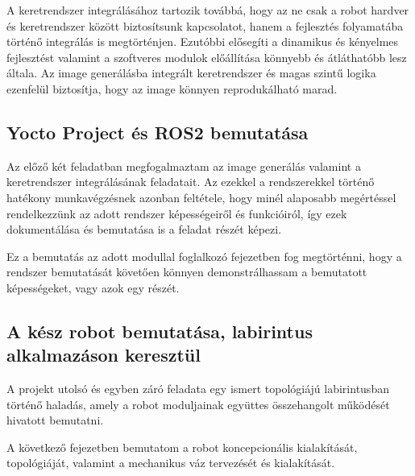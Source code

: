 A keretrendszer integrálásához tartozik továbbá, hogy az ne csak a robot hardver
és keretrendszer között biztosítsunk kapcsolatot, hanem a fejlesztés folyamatába
történő integrálás is megtörténjen. Ezutóbbi elősegíti a dinamikus és kényelmes
fejlesztést valamint a szoftveres modulok előállítása könnyebb és átláthatóbb
lesz általa. Az image generálásba integrált keretrendszer és magas szintű logika
ezenfelül biztosítja, hogy az image könnyen reprodukálható marad.


\subsection{Yocto Project és ROS2 bemutatása}

Az előző két feladatban megfogalmaztam az image generálás valamint a
keretrendszer integrálásának feladatait. Az ezekkel a rendszerekkel történő
hatékony munkavégzésnek azonban feltétele, hogy minél alaposabb megértéssel
rendelkezzünk az adott rendszer képességeiről és funkcióiról, így ezek
dokumentálása és bemutatása is a feladat részét képezi.

Ez a bemutatás az adott modullal foglalkozó fejezetben fog megtörténni, hogy a
rendszer bemutatását követően könnyen demonstrálhassam a bemutatott képességeket,
vagy azok egy részét.

\subsection{A kész robot bemutatása, labirintus alkalmazáson keresztül}

A projekt utolsó és egyben záró feladata egy ismert topológiájú labirintusban
történő haladás, amely a robot moduljainak együttes összehangolt működését
hivatott bemutatni. 


\medskip

A következő fejezetben bemutatom a robot koncepcionális kialakítását,
topológiáját, valamint a mechanikus váz tervezését és kialakítását.
